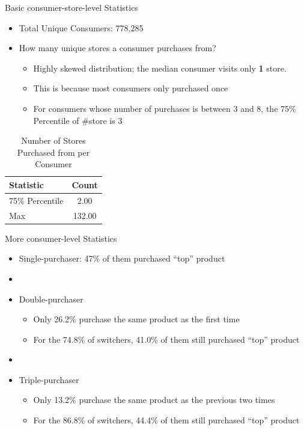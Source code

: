 \documentclass[aspectratio=169]{beamer}  %
\begin{document}
\begin{frame}{Basic consumer-store-level Statistics}
    \begin{itemize}
        \item Total Unique Consumers: 778,285
        \item How many unique stores a consumer purchases from?
        \begin{itemize}
            \item Highly skewed distribution; the median consumer visits only \textbf{1} store.
            \item This is because most consumers only purchased once
            \item For consumers whose number of purchases is between 3 and 8, the 75\% Percentile of \#store is 3
        \end{itemize}
    \end{itemize}

    \begin{table}[]
        \centering
        \scriptsize
        \caption{Number of Stores Purchased from per Consumer}
        \begin{tabular}{l c}
            \toprule
            Statistic & Count \\
            \midrule
            75\% Percentile & 2.00 \\
            Max & 132.00 \\
            \bottomrule
        \end{tabular}
    \end{table}
\end{frame}

\begin{frame}{More consumer-level Statistics}
\begin{itemize}
    \item Single-purchaser: 47\% of them purchased ``top'' product
    \item []
    \item Double-purchaser
    \begin{itemize}
        \item Only 26.2\% purchase the same product as the first time
        \item For the 74.8\% of switchers, 41.0\% of them still purchased ``top'' product
    \end{itemize}
    \item []
    \item Triple-purchaser
    \begin{itemize}
        \item Only 13.2\% purchase the same product as the previous two times
        \item For the 86.8\% of switchers, 44.4\% of them still purchased ``top'' product
    \end{itemize}
\end{itemize}    
\end{frame}
\end{document}
